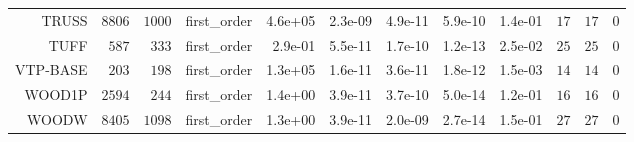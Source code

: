 \begin{longtable}{rrrrrrrrrrrr}
  TRUSS & \(  8806\) & \(  1000\) & first\_order &  4.6e+05 &  2.3e-09 &  4.9e-11 &  5.9e-10 &  1.4e-01 & \(    17\) & \(    17\) & \(     0\) \\
  TUFF & \(   587\) & \(   333\) & first\_order &  2.9e-01 &  5.5e-11 &  1.7e-10 &  1.2e-13 &  2.5e-02 & \(    25\) & \(    25\) & \(     0\) \\
  VTP-BASE & \(   203\) & \(   198\) & first\_order &  1.3e+05 &  1.6e-11 &  3.6e-11 &  1.8e-12 &  1.5e-03 & \(    14\) & \(    14\) & \(     0\) \\
  WOOD1P & \(  2594\) & \(   244\) & first\_order &  1.4e+00 &  3.9e-11 &  3.7e-10 &  5.0e-14 &  1.2e-01 & \(    16\) & \(    16\) & \(     0\) \\
  WOODW & \(  8405\) & \(  1098\) & first\_order &  1.3e+00 &  3.9e-11 &  2.0e-09 &  2.7e-14 &  1.5e-01 & \(    27\) & \(    27\) & \(     0\) \\\hline
\end{longtable}
